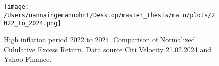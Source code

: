 \begin{figure}[H]
    \centering
    \texttt{[image: /Users/nannaingemannohrt/Desktop/master\_thesis/main/plots/2022\_to\_2024.png]}
    \caption{High inflation period 2022 to 2024. Comparison of Normalized Cululative Excess Return. Data source Citi Velocity 21.02.2024 
    and Yahoo Finance.}
    \label{fig:2022_2024}
\end{figure}
\noindent

